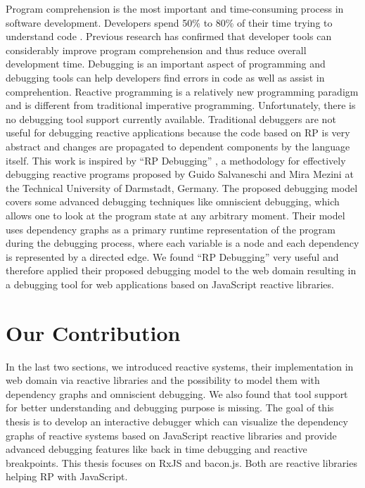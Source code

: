 Program comprehension is the most important and time-consuming process in software development. Developers spend 50\% to 80\% of their time trying to understand code \cite{6032450,6772122}. Previous research has confirmed that developer tools can considerably improve program comprehension \cite{1421034} and thus reduce overall development time. Debugging is an important aspect of programming and debugging tools can help developers find errors in code as well as assist in comprehention. 
Reactive programming is a relatively new programming paradigm and is different from traditional imperative programming. 
Unfortunately, there is no debugging tool support currently available.
Traditional debuggers are not useful for debugging reactive applications because the code based on RP is very abstract and changes are propagated to dependent components by the language itself.
This work is inspired by ``RP Debugging'' \cite{Salvaneschi:2016:DRP:2884781.2884815}, a methodology for effectively debugging reactive programs proposed by Guido Salvaneschi and Mira Mezini at the Technical University of Darmstadt, Germany. The proposed debugging model covers some advanced debugging techniques like omniscient debugging, which allows one to look at the program
state at any arbitrary moment. Their model uses dependency graphs as a primary runtime representation of the program during the debugging process, where each variable is a node and each dependency is represented by a directed edge. We found ``RP Debugging'' very useful and therefore applied their proposed debugging model to the web domain resulting in a debugging tool for web applications based on JavaScript reactive libraries. 

\section{Our Contribution}

In the last two sections, we introduced reactive systems, their implementation in web domain via reactive libraries and the possibility to model them with dependency graphs and omniscient debugging. We also found that tool support for better understanding and debugging purpose is missing.
The goal of this thesis is to develop an interactive debugger which can visualize the dependency graphs of reactive systems based on JavaScript reactive libraries and provide advanced debugging features like back in time debugging and reactive breakpoints. This thesis focuses on RxJS and bacon.js.  Both are reactive libraries helping RP with JavaScript.


